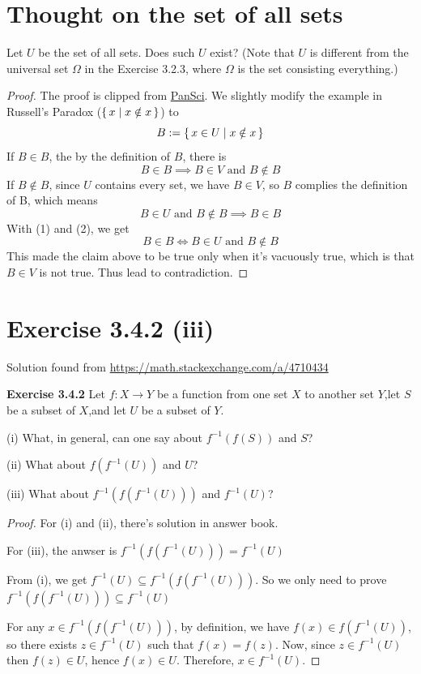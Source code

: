 \documentclass{article}
\begin{document}
\section{Thought on the set of all sets}
Let $U$ be the set of all sets. Does such $U$ exist?
(Note that $U$ is different from the universal set $\Omega$ in the Exercise 3.2.3,
where $\Omega$ is the set consisting everything.)
\begin{proof}
    The proof is clipped from \href{https://pansci.asia/archives/75290}{PanSci}.
    We slightly modify the example in Russell's Paradox ($\set{x|x\notin x}$) to
    \[B:=\set{x\in U|x\notin x}\]
    If $B\in B$, the by the definition of $B$, there is
    \[B\in B\implies B\in V \text{ and }B\notin B\tag{1}\]
    If $B\notin B$, since $U$ contains every set, we have $B\in V$,
    so $B$ complies the definition of B, which means
    \[B\in U\text{ and }B\notin B\implies B\in B\tag{2}\]
    With (1) and (2), we get
    \[B\in B\iff B\in U\text{ and }B\notin B\]
    This made the claim above to be true only when it's vacuously true,
    which is that $B\in V$ is not true. Thus lead to contradiction.
\end{proof}

\section{Exercise 3.4.2 (iii)}
Solution found from \url{https://math.stackexchange.com/a/4710434}

\textbf{Exercise 3.4.2} Let $f : X \to Y$ be a function from one set $X$ to another set $Y$,let $S$ be a subset of
$X$,and let $U$ be a subset of $Y$.

(i) What, in general, can one say about $f^{-1}( f (S))$ and $S$?

(ii) What about $f( f^{-1}(U))$ and $U$?

(iii) What about $f^{-1}( f ( f^{-1}(U)))$ and $f^{-1}(U)$?

\begin{proof}
    For (i) and (ii), there's solution in answer book.

    For (iii), the anwser is $f^{-1}( f ( f^{-1}(U)))=f^{-1}(U)$

    From (i), we get $f^{-1}(U)\subseteq f^{-1}( f ( f^{-1}(U)))$. So we only need to prove
    $f^{-1}( f ( f^{-1}(U)))\subseteq f^{-1}(U)$

    For any $x\in f^{-1}( f ( f^{-1}(U)))$, by definition,
    we have $f(x)\in f ( f^{-1}(U))$,
    so there exists $z\in f^{-1}(U)$ such that $f(x)=f(z)$.
    Now, since $z\in f^{-1}(U)$ then $f(z)\in U$,
    hence $f(x)\in U$. Therefore, $x\in f^{-1}(U)$.
\end{proof}
\end{document}
